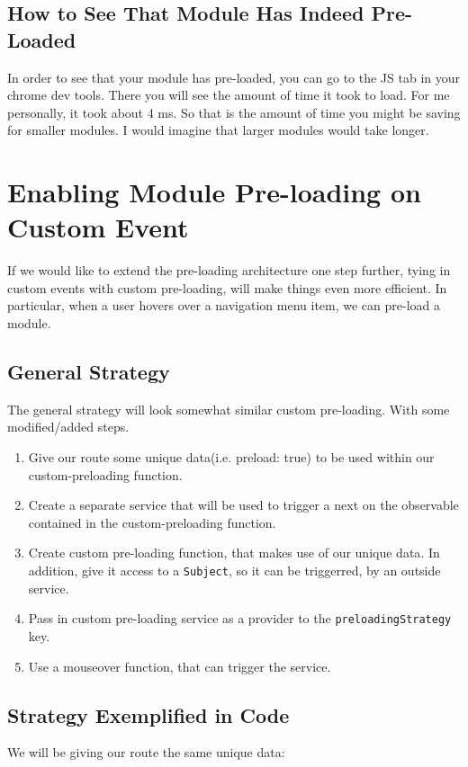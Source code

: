 \subsection{ How to See That Module Has Indeed Pre-Loaded }
In order to see that your module has pre-loaded, you can go to the JS
tab in your chrome dev tools. There you will see the amount of time it 
took to load. For me personally, it took about 4 ms. So that is the amount 
of time you might be saving for smaller modules. I would imagine that 
larger modules would take longer. 

\section{ Enabling Module Pre-loading on Custom Event }
If we would like to extend the pre-loading architecture one step further, 
tying in custom events with custom pre-loading, will make things even 
more efficient. In particular, when a user hovers over a navigation menu item, 
we can pre-load a module. 

\subsection{ General Strategy }
The general strategy will look somewhat similar custom pre-loading. 
With some modified/added steps.

\begin{enumerate}
  \item Give our route some unique data(i.e. preload: true)
   to be used within our custom-preloading function.
   \item Create a separate service that will be used to trigger a next on the 
   observable contained in the custom-preloading function. 
   \item Create custom pre-loading function, that makes use of our unique data. In addition, 
   give it access to a \lstinline{Subject}, so it can be triggerred, by an outside service. 
   \item Pass in custom pre-loading service as a provider to the \lstinline{preloadingStrategy} 
   key.
  \item Use a mouseover function, that can trigger the service.
\end{enumerate}

\subsection{ Strategy Exemplified in Code }
We will be giving our route the same unique data: 

